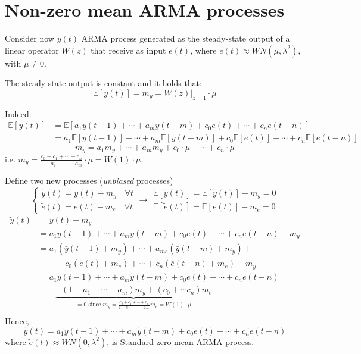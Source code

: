 \section{Non-zero mean ARMA processes}
Consider now $y(t)$ ARMA process generated as the steady-state output of a linear operator $W(z)$ that receive as input $e(t)$, where $e(t) \approx W N\left(\mu, \lambda^{2}\right)$, with $\mu\neq0$.

\begin{theorem}
	The steady-state output is constant and it holds that:
	\[
		\mathbb{E}[y(t)]=m_{y}=W(z)|_{z=1} \cdot \mu
	\]
\end{theorem}

Indeed:
\begin{align*}
		\mathbb{E}[y(t)] &=\mathbb{E}\left[a_{1} y(t-1)+\cdots+a_{m} y(t-m)+c_{0} e(t)+\cdots+c_{n} e(t-n)\right] \\
		&=a_{1} \mathbb{E}[y(t-1)]+\cdots+a_{m} \mathbb{E}[y(t-m)]+c_{0} \mathbb{E}[e(t)]+\cdots+c_{n} \mathbb{E}[e(t-n)]
\end{align*}
$$
m_{y}=a_{1} m_{y}+\cdots+a_{m} m_{y}+c_{0} \cdot \mu+\cdots+c_{n} \cdot \mu
$$
i.e. $m_{y}=\frac{c_{0}+c_{1}+\cdots+c_{n}}{1-a_{1}-\cdots-a_{m}} \cdot \mu=W(1) \cdot \mu$.
	
Define two new processes (\emph{unbiased} processes)
$$
\begin{cases}
	\tilde{y}(t)=y(t)-m_{y} \quad\forall t\\
	\tilde{e}(t)=e(t)-m_{e} \quad\forall t
\end{cases}
\rightarrow \begin{array}{l}
	\mathbb{E}[\tilde{y}(t)]=\mathbb{E}[y(t)]-m_{y}=0 \\
	\mathbb{E}[\tilde{e}(t)]=\mathbb{E}[e(t)]-m_{e}=0
\end{array}
$$
\begin{align*}
	\tilde{y}(t)&= y(t)-m_{y}\\
	&= a_{1} y(t-1)+\cdots+a_{m} y(t-m)+c_{0} e(t)+\cdots+c_{n} e(t-n)-m_{y} \\
	&= a_{1}\left(\bar{y}(t-1)+m_{y}\right)+\cdots+a_{m e}\left(\bar{y}(t-m)+m_{y}\right)+\\
	&\qquad +c_{0}\left(\tilde{e}(t)+m_{e}\right)+\cdots+c_{n}\left(\bar{e}(t-n)+m_{e}\right)-m_{y} \\
	&= a_{1} \tilde{y}(t-1)+\cdots+a_{m} \tilde{y}(t-m)+c_{0} \tilde{e}(t)+\cdots+c_{n} \tilde{e}(t-n) \\
	&\qquad \underbrace{-\left(1-a_{1}-\cdots-a_{m}\right) m_{y}+\left(c_{0}+\cdots c_{n}\right) m_{e}}_{=0\text { since } m_{y}=\frac{c_{0}+c_{1}+\cdots+c_{n}}{1-a_{1}-\cdots-a_{m e}} m_{e}=W(1) \cdot \mu} \\
\end{align*}
Hence,
$$
\tilde{y}(t)=a_{1} \tilde{y}(t-1)+\cdots+a_{m} \tilde{y}(t-m)+c_{0} \tilde{e}(t)+\cdots+c_{n} \tilde{e}(t-n)
$$
where $\tilde{e}(t)\approx W N\left(0, \lambda^{2}\right)$, is Standard zero mean ARMA process.

